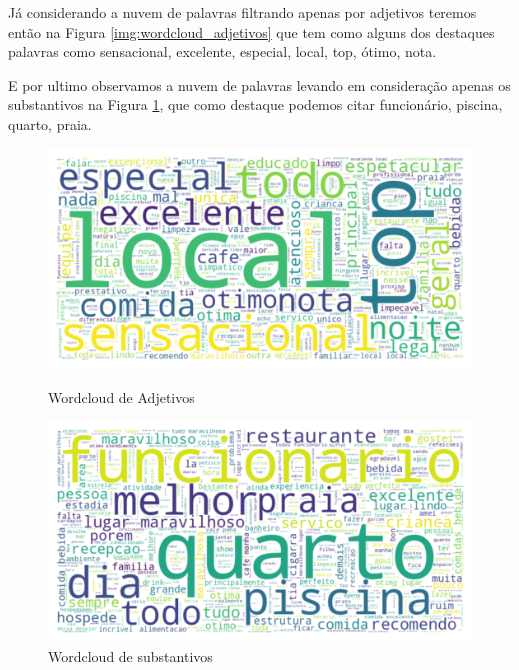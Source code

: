 Já considerando a nuvem de palavras filtrando apenas por adjetivos teremos então na Figura \ref{img:wordcloud_adjetivos} que tem como alguns dos destaques palavras como sensacional, excelente, especial, local, top, ótimo, nota.

E por ultimo observamos a nuvem de palavras levando em consideração apenas os substantivos na Figura \ref{img:wordcloud_substantivos}, que como destaque podemos citar funcionário, piscina, quarto, praia.

\begin{figure}
	\centering
	\begin{minipage}{0.45\textwidth}
		\centering
		\includegraphics[width=1\textwidth]{figs/exploratoria/wordcloud_adjetivos.png}
		\caption{Wordcloud de Adjetivos}
		\label{img:wordcloud_adjetivos}
	\end{minipage}
	\begin{minipage}{0.45\textwidth}
		\centering
		\includegraphics[width=1\textwidth]{figs/exploratoria/wordcloud_substantivos.png}
		\caption{Wordcloud de substantivos}
		\label{img:wordcloud_substantivos}
	\end{minipage}
\end{figure}

